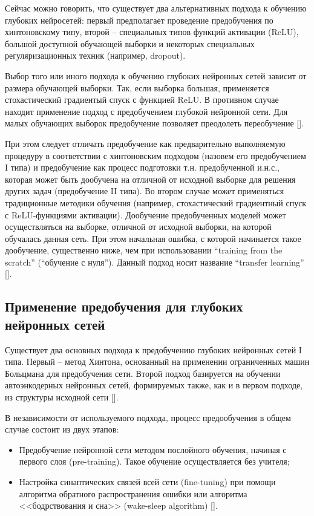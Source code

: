 Сейчас можно говорить, что существует два альтернативных подхода к обучению глубоких нейросетей: первый предполагает проведение предобучения по хинтоновскому типу, второй -- специальных типов функций активации (ReLU), большой доступной обучающей выборки и некоторых специальных регуляризационных техник (например, dropout).

Выбор того или иного подхода к обучению глубоких нейронных сетей зависит от размера обучающей выборки. Так, если выборка большая, применяется стохастический градиентый спуск с функцией ReLU. В противном случае находит применение подход с предобучением глубокой нейронной сети. Для малых обучающих выборок предобучение позволяет преодолеть переобучение [].

При этом следует отличать предобучение как предварительно выполняемую процедуру в соответствии с хинтоновским подходом (назовем его предобучением I типа) и предобучение как процесс подготовки т.н. предобученной и.н.с., которая может быть дообучена на отличной от исходной выборке для решения других задач (предобучение II типа). Во втором случае может применяться традиционные методики обучения (например, стохастический градиентный спуск с ReLU-функциями активации). Дообучение предобученных моделей может осуществляться на выборке, отличной от исходной выборки, на которой обучалась данная сеть. При этом начальная ошибка, с которой начинается такое дообучение, существенно ниже, чем при использовании ``training from the scratch'' (``обучение с нуля''). Данный подход носит название ``transfer learning'' [\scncite{}]. 

\subsection{Применение предобучения для глубоких нейронных сетей}

Существует два основных подхода к предобучению глубоких нейронных сетей I типа. Первый -- метод Хинтона, основанный на применении ограниченных машин Больцмана для предобучения сети. Второй подход базируется на обучении автоэнкодерных нейронных сетей, формируемых также, как и в первом подходе, из структуры исходной сети []. 

В независимости от используемого подхода, процесс предообучения в общем случае состоит из двух этапов: 
\begin{itemize}
	\item Предобучение нейронной сети методом послойного обучения, начиная с первого слоя  (pre-training). Такое обучение осуществляется без учителя;
	\item Настройка синаптических связей всей сети (fine-tuning) при помощи алгоритма обратного распространения ошибки или алгоритма <<бодрствования и сна>> (wake-sleep algorithm) [\scncite{}].
\end{itemize}

